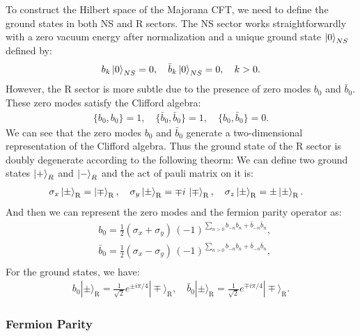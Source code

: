 To construct the Hilbert space of the Majorana CFT, we need to define the ground states in both NS and R sectors. The NS sector works straightforwardly with a zero vacuum energy after normalization and a unique ground state $ \ket{0}_{NS} $ defined by:
\begin{align}
  b_k \ket{0}_{NS} = 0, \quad \bar{b}_k \ket{0}_{NS} = 0, \quad k > 0.
\end{align}
However, the R sector is more subtle due to the presence of zero modes $ b_0 $ and $ \bar{b}_0 $. These zero modes satisfy the Clifford algebra:
\begin{align}
  \{ b_0, b_0 \} = 1, \quad \{ \bar{b}_0, \bar{b}_0 \} = 1, \quad \{ b_0, \bar{b}_0 \} = 0.
\end{align}
We can see that the zero modes $ b_0 $ and $ \bar{b}_0 $ generate a two-dimensional representation of the Clifford algebra. Thus the ground state of the R sector is doubly degenerate according to the following theorm:
We can define two ground states $ \ket{+}_{R} $ and $ \ket{-}_{R} $ and the act of pauli matrix on it is:
\begin{align}
  \sigma_x \ket{\pm}_{\mathrm R} &= \ket{\mp}_{\mathrm R}, \quad \sigma_y \ket{\pm}_{\mathrm R} = \mp i\,\ket{\mp}_{\mathrm R}, \quad \sigma_z \ket{\pm}_{\mathrm R} = \pm \ket{\pm}_{\mathrm R}.
\end{align}
And then we can represent the zero modes and the fermion parity operator as:
\begin{align}
   & b_0 = \frac{1}{2}\left( \sigma_x + \sigma_y \right)
        \,(-1)^{\sum_{n>0} b_{-n} b_n + \bar b_{-n} \bar b_n}, \\
   & \bar b_0 = \frac{1}{2}\left( \sigma_x - \sigma_y \right)
        \,(-1)^{\sum_{n>0} b_{-n} b_n + \bar b_{-n} \bar b_n}, \\
\end{align}
For the ground states, we have: 
\begin{align}\label{eq:Majorana zero mode action on R ground states}
  b_0|\pm\rangle_\mathrm{R}=\frac{1}{\sqrt{2}}e^{\pm i\pi/4}|\mp\rangle_\mathrm{R},\quad\bar{b}_0|\pm\rangle_\mathrm{R}=\frac{1}{\sqrt{2}}e^{\mp i\pi/4}|\mp\rangle_\mathrm{R}.
\end{align}

\subsubsection{Fermion Parity}\label{sec:Fermion Parity in Majorana CFT}

